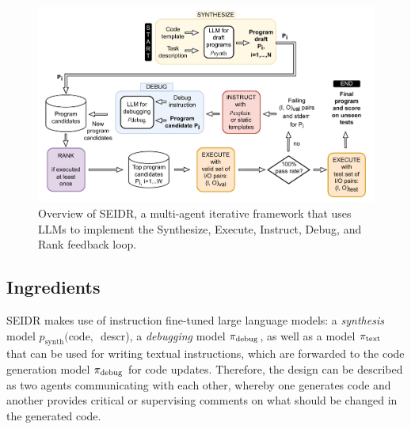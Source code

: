 \begin{figure}
    \centering
    \includegraphics[width=\linewidth,trim={0mm 0mm 0mm 0mm}]{images/codex-for-psb-seidr-methodology-5.drawio.pdf}
    \caption{Overview of SEIDR, a multi-agent iterative framework that uses LLMs to implement the Synthesize, Execute, Instruct, Debug, and Rank feedback loop.}
    \label{fig:method}
\end{figure}
 

\subsection{Ingredients}
\label{sec:seidr-ingredients}

SEIDR makes use of instruction fine-tuned large language models: a \emph{synthesis} model $p_{\text{synth}}(\text{code, }$ descr), a \emph{debugging} model $ \pi_\text{debug} $, as well as a model $ \pi_\text{text} $ that can be used for writing textual instructions, which are forwarded to the code generation model $ \pi_\text{debug} $ for code updates. 
Therefore, the design can be described as two agents communicating with each other, whereby one generates code and another provides critical or supervising comments on what should be changed in the generated code. 

